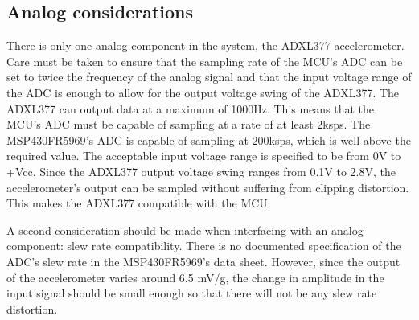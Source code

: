 \subsection{Analog considerations}
There is only one analog component in the system, the ADXL377 accelerometer. Care must be taken to ensure that the sampling rate of the MCU's ADC can be set to twice the frequency of the analog signal and that the input voltage range of the ADC is enough to allow for the output voltage swing of the ADXL377. The ADXL377 can output data at a maximum of 1000Hz.  This means that the MCU's ADC must be capable of sampling at a rate of at least 2ksps. The MSP430FR5969's ADC is capable of sampling at 200ksps, which is well above the required value.  The acceptable input voltage range is specified to be from 0V to +Vcc. Since the ADXL377 output voltage swing ranges from 0.1V to 2.8V, the accelerometer's output can be sampled without suffering from clipping distortion.  This makes the ADXL377 compatible with the MCU.

A second consideration should be made when interfacing with an analog component: slew rate compatibility. There is no documented specification of the ADC's slew rate in the MSP430FR5969's data sheet. However, since the output of the accelerometer varies around 6.5 mV/g, the change in amplitude in the input signal should be small enough so that there will not be any slew rate distortion.

